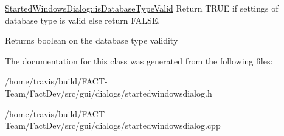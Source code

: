 \hyperlink{classGui_1_1Dialogs_1_1StartedWindowsDialog_ad582a62ec4204c2ef5081c5431824491}{Started\-Windows\-Dialog\-::is\-Database\-Type\-Valid} Return T\-R\-U\-E if settings of database type is valid else return F\-A\-L\-S\-E. 

\begin{DoxyReturn}{Returns}
boolean on the database type validity 
\end{DoxyReturn}


The documentation for this class was generated from the following files\-:\begin{DoxyCompactItemize}
\item 
/home/travis/build/\-F\-A\-C\-T-\/\-Team/\-Fact\-Dev/src/gui/dialogs/startedwindowsdialog.\-h\item 
/home/travis/build/\-F\-A\-C\-T-\/\-Team/\-Fact\-Dev/src/gui/dialogs/startedwindowsdialog.\-cpp\end{DoxyCompactItemize}
